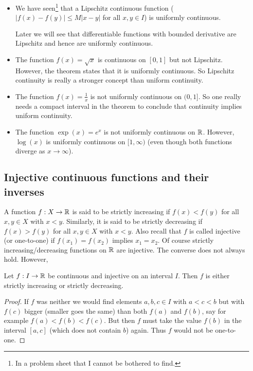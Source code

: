 \documentclass[10pt, a4paper]{article}
\begin{document}
\begin{remark}\phantom{}
    \begin{itemize}
        \item We have seen\footnote{In a problem sheet that I cannot be bothered to find.} that a Lipschitz continuous function
        ($|f(x) - f(y)| \leq M|x - y|$ for all $x, y \in I$)
        is uniformly continuous.

        Later we will see that differentiable functions with bounded derivative are Lipschitz and hence are uniformly continuous.

        \item The function $f(x) = \sqrt{x}$ is continuous on $[0, 1]$ but not Lipschitz.
        However,
        the theorem states that it is uniformly continuous.
        So Lipschitz continuity is really a stronger concept than uniform continuity.

        \item The function $f(x) = \frac{1}{x}$ is not uniformly continuous on $(0, 1]$.
        So one really needs a compact interval in the theorem to conclude that continuity implies uniform continuity.

        \item The function $\exp(x) = e ^ x$ is not uniformly continuous on $\mathbb{R}$.
        However,
        $\log(x)$ is uniformly continuous on $[1, \infty)$
        (even though both functions diverge as $x \rightarrow \infty$).
    \end{itemize}
\end{remark}

\subsection{Injective continuous functions and their inverses}

A function $f : X \rightarrow \mathbb{R}$ is said to be strictly increasing if $f(x) < f(y)$ for all $x, y \in X$ with $x < y$.
Similarly,
it is said to be strictly decreasing if $f(x) > f(y)$ for all $x, y \in X$ with $x < y$.
Also recall that $f$ is called injective
(or one-to-one)
if $f(x_1) = f(x_2)$ implies $x_1 = x_2$.
Of course strictly increasing/decreasing functions on $\mathbb{R}$ are injective.
The converse does not always hold.
However,
\begin{proposition}
    Let $f : I \rightarrow \mathbb{R}$ be continuous and injective on an interval $I$.
    Then $f$ is either strictly increasing or strictly decreasing.
    \begin{proof}
        If $f$ was neither we would find elements $a, b, c \in I$ with $a < c < b$ but with $f(c)$ bigger
        (smaller goes the same)
        than both $f(a)$ and $f(b)$,
        say for example $f(a) < f(b) < f(c)$.
        But then $f$ must take the value $f(b)$ in the interval $[a, c]$
        (which does not contain $b$)
        again.
        Thus $f$ would not be one-to-one.
    \end{proof}
\end{proposition}
\end{document}
